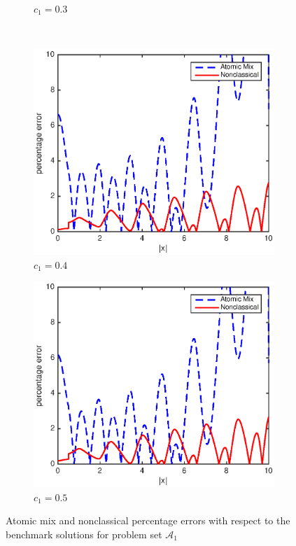 \documentclass[12pt]{article}
\newcommand{\seta}{\mathcal{A}}
\begin{document}
{\begin{figure}[p]
\begin{subfigure}{0.495\textwidth}
        \caption{$c_1 = 0.3$}
        \label{figerrA30}
    \end{subfigure}
    \\
    \centering
    \begin{subfigure}{0.495\textwidth}
        \centering
        \includegraphics[width=\textwidth]{NSE_err_A40.eps}
        \caption{$c_1 = 0.4$}
        \label{figerrA40}
    \end{subfigure}
    \hfill
    \begin{subfigure}{0.495\textwidth}
        \centering
        \includegraphics[width=\textwidth]{NSE_err_A50.eps}
        \caption{$c_1 = 0.5$}
        \label{figerrA50}
    \end{subfigure}
    \caption{Atomic mix and nonclassical percentage errors with respect to the benchmark solutions for problem set $\seta_1$}
    \label{figerrA1}
\end{figure}





}
\end{document}
